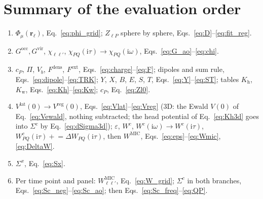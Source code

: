 \documentclass[11pt,a4paper]{article}
\newcommand{\br}{\mathbf{r}}
\newcommand{\ii}{\mathrm{i}}
\newcommand{\MIC}{\mathrm{MIC}}
\newcommand{\head}{\mathrm{h}}
\newcommand{\wing}{\mathrm{w}}
\newcommand{\lat}{\mathrm{lat}}
\newcommand{\reg}{\mathrm{reg}}
\newcommand{\occ}{\mathrm{occ}}
\newcommand{\vir}{\mathrm{vir}}
\newcommand{\dens}{\mathrm{dens}}
\newcommand{\ext}{\mathrm{ext}}
\begin{document}
\section*{Summary of the evaluation order}

\begin{enumerate}
\item $\Phi_\mu(\br_\ell)$, Eq.~\eqref{eq:phi_grid}; $Z_{\ell P}$ sphere by sphere, Eqs.~\eqref{eq:D}--\eqref{eq:fit_reg}.
\item $G^\occ,G^\vir$, $\chi_{\ell\ell'}$, $\chi_{PQ}(\ii\tau)\to\chi_{PQ}(\ii\omega)$, Eqs.~\eqref{eq:G_ao}--\eqref{eq:chi}.
\item $c_P$, $\Pi$, $V_b$, $F^\dens$, $F^\ext$, Eqs.~\eqref{eq:charge}--\eqref{eq:F}; dipoles and sum rule, Eqs.~\eqref{eq:dipole}--\eqref{eq:TRK}; $Y$, $X$, $B$, $E$, $S$, $T$, Eqs.~\eqref{eq:Y}--\eqref{eq:ST}; tables $K_\head$, $K_\wing$, Eqs.~\eqref{eq:Kh}--\eqref{eq:Kw}; $c_P$, Eq.~\eqref{eq:Zl0}.
\item $V^\lat(0)\to V^\reg(0)$, Eqs.~\eqref{eq:Vlat}--\eqref{eq:Vreg} (3D: the Ewald $V(0)$ of Eq.~\eqref{eq:Vewald}, nothing subtracted; the head potential of Eq.~\eqref{eq:Kh3d} goes into $\Sigma^c$ by Eq.~\eqref{eq:dSigma3d}); $\varepsilon$, $W^c$, $W^c(\ii\omega)\to W^c(\ii\tau)$, $W^c_{PQ}(\ii\tau) \mathrel{+}= \Delta W_{PQ}(\ii\tau)$, then $W^\MIC$, Eqs.~\eqref{eq:eps}--\eqref{eq:Wmic}, \eqref{eq:DeltaW}.
\item $\Sigma^x$, Eq.~\eqref{eq:Sx}.
\item Per time point and panel: $W^\MIC_{\ell\ell'}$, Eq.~\eqref{eq:W_grid}; $\Sigma^c$ in both branches, Eqs.~\eqref{eq:Sc_neg}--\eqref{eq:Sc_ao}; then Eqs.~\eqref{eq:Sc_freq}--\eqref{eq:QP}.
\end{enumerate}
\end{document}
